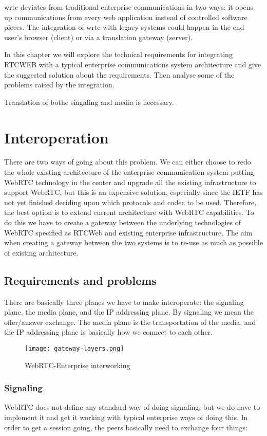\gls{wrtc} deviates from traditional enterprise communications in two ways: it opens up communications from every web application instead of controlled software pieces. The integration of \gls{wrtc} with legacy systems could happen in the end user's browser (client) or via a translation gateway (server).

In this chapter we will explore the technical requirements for integrating RTCWEB with a typical enterprise communications system architecture and give the suggested solution about the requirements. Then analyse some of the problems raised by the integration.

Translation of bothe singaling and media is necessary.

\section{Interoperation}
There are two ways of going about this problem. We can either choose to redo the whole existing architecture of the enterprise communication system putting WebRTC technology in the center and upgrade all the existing infrastructure to support WebRTC, but this is an expensive solution, especially since the IETF has not yet finished deciding upon which protocols and codec to be used. Therefore, the best option is to extend current architecture with WebRTC capabilities. To do this we have to create a gateway between the underlying technologies of WebRTC specified as RTCWeb and existing enterprise infrastructure. The aim when creating a gateway between the two systems is to re-use as much as possible of existing architecture.

\subsection{Requirements and problems}
There are basically three planes we have to make interoperate: the signaling plane, the media plane, and the IP addressing plane. 
By signaling we mean the offer/answer exchange. The media plane is the transportation of the media, and the IP addressing plane is basically how we connect to each other.

\begin{figure}[here]
\centerline{\texttt{[image: gateway-layers.png]}}
\caption{WebRTC-Enterprise interworking}
\label{fig:gateway-layers}
\end{figure}

\subsubsection{Signaling}
WebRTC does not define any standard way of doing signaling, but we do have to implement it and get it working with typical enterprise ways of doing this. In order to get a session going, the peers basically need to exchange four things\cite{??}:

